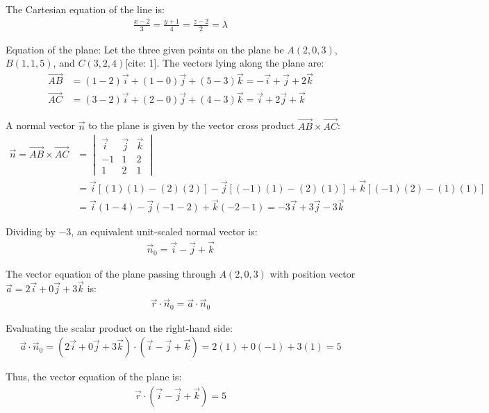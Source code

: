 \begin{enumerate}[label=\thesubsection.\arabic*, ref=\thesubsection.\theenumi]
The Cartesian equation of the line is:
\begin{align*}
	\frac{x - 2}{3} = \frac{y + 1}{4} = \frac{z - 2}{2} = \lambda
\end{align*}

Equation of the plane:
Let the three given points on the plane be $A(2, 0, 3)$, $B(1, 1, 5)$, and $C(3, 2, 4)$[cite: 1].
The vectors lying along the plane are:
\begin{align*}
	\vec{AB} &= (1 - 2)\vec{i} + (1 - 0)\vec{j} + (5 - 3)\vec{k} = -\vec{i} + \vec{j} + 2\vec{k} \\
	\vec{AC} &= (3 - 2)\vec{i} + (2 - 0)\vec{j} + (4 - 3)\vec{k} = \vec{i} + 2\vec{j} + \vec{k}
\end{align*}

A normal vector $\vec{n}$ to the plane is given by the vector cross product $\vec{AB} \times \vec{AC}$:
\begin{align*}
	\vec{n} = \vec{AB} \times \vec{AC} &= \begin{vmatrix}
		\vec{i} & \vec{j} & \vec{k} \\
		-1 & 1 & 2 \\
		1 & 2 & 1
	\end{vmatrix} \\
	&= \vec{i}\left[(1)(1) - (2)(2)\right] - \vec{j}\left[(-1)(1) - (2)(1)\right] + \vec{k}\left[(-1)(2) - (1)(1)\right] \\
	&= \vec{i}(1 - 4) - \vec{j}(-1 - 2) + \vec{k}(-2 - 1) 
	= -3\vec{i} + 3\vec{j} - 3\vec{k}
\end{align*}

Dividing by $-3$, an equivalent unit-scaled normal vector is:
\begin{align*}
	\vec{n}_0 = \vec{i} - \vec{j} + \vec{k}
\end{align*}

The vector equation of the plane passing through $A(2, 0, 3)$ with position vector $\vec{a} = 2\vec{i} + 0\vec{j} + 3\vec{k}$ is:
\begin{align*}
	\vec{r} \cdot \vec{n}_0 = \vec{a} \cdot \vec{n}_0
\end{align*}

Evaluating the scalar product on the right-hand side:
\begin{align*}
	\vec{a} \cdot \vec{n}_0 = (2\vec{i} + 0\vec{j} + 3\vec{k}) \cdot (\vec{i} - \vec{j} + \vec{k}) = 2(1) + 0(-1) + 3(1) = 5
\end{align*}

Thus, the vector equation of the plane is:
\begin{align*}
	\vec{r} \cdot (\vec{i} - \vec{j} + \vec{k}) = 5
\end{align*}


\end{enumerate}
